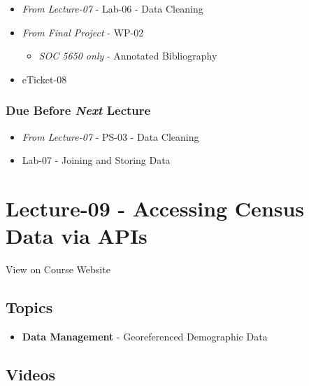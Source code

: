 \documentclass[]{book}
\providecommand{\tightlist}{%
  \setlength{\itemsep}{0pt}\setlength{\parskip}{0pt}}
\begin{document}
\begin{itemize}
\tightlist
\item
  \emph{From Lecture-07} - Lab-06 - Data Cleaning
\item
  \emph{From Final Project} - WP-02

  \begin{itemize}
  \tightlist
  \item
    \emph{SOC 5650 only} - Annotated Bibliography
  \end{itemize}
\item
  eTicket-08
\end{itemize}

\hypertarget{due-before-next-lecture-6}{%
\subsubsection*{\texorpdfstring{Due Before \emph{Next} Lecture}{Due Before Next Lecture}}\label{due-before-next-lecture-6}}

\begin{itemize}
\tightlist
\item
  \emph{From Lecture-07} - PS-03 - Data Cleaning
\item
  Lab-07 - Joining and Storing Data
\end{itemize}

\hypertarget{lecture-09---accessing-census-data-via-apis}{%
\section*{Lecture-09 - Accessing Census Data via APIs}\label{lecture-09---accessing-census-data-via-apis}}

View on Course Website

\hypertarget{topics-9}{%
\subsection*{Topics}\label{topics-9}}

\begin{itemize}
\tightlist
\item
  \textbf{Data Management} - Georeferenced Demographic Data
\end{itemize}

\hypertarget{videos-1}{%
\subsection*{Videos}\label{videos-1}}
\end{document}
